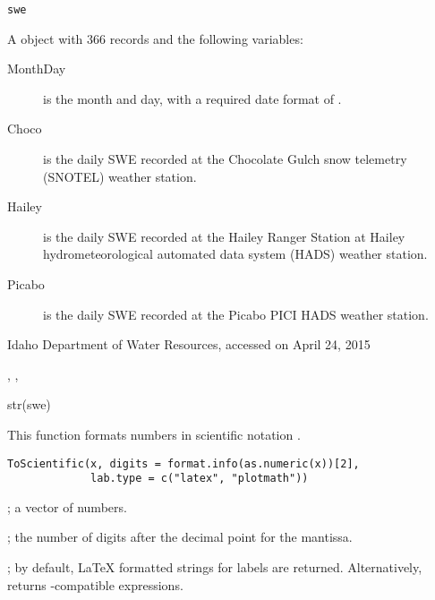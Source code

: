 \documentclass[a4paper]{book}
\begin{document}
%
\begin{Usage}
\begin{verbatim}
swe
\end{verbatim}
\end{Usage}
%
\begin{Format}
A  object with 366 records and the following variables:
\begin{description}

\item[MonthDay] is the month and day, with a required date format of .
\item[Choco] is the daily SWE recorded at the Chocolate Gulch snow telemetry (SNOTEL) weather station.
\item[Hailey] is the daily SWE recorded at the Hailey Ranger Station at Hailey hydrometeorological automated data system (HADS) weather station.
\item[Picabo] is the daily SWE recorded at the Picabo PICI HADS weather station.

\end{description}

\end{Format}
%
\begin{Source}\relax
Idaho Department of Water Resources, accessed on April 24, 2015
\end{Source}
%
\begin{SeeAlso}\relax
{}, , 
\end{SeeAlso}
%
\begin{Examples}
\begin{ExampleCode}
str(swe)
\end{ExampleCode}
\end{Examples}
%
\begin{Description}\relax
This function formats numbers in scientific notation .
\end{Description}
%
\begin{Usage}
\begin{verbatim}
ToScientific(x, digits = format.info(as.numeric(x))[2],
             lab.type = c("latex", "plotmath"))
\end{verbatim}
\end{Usage}
%
\begin{Arguments}
\begin{ldescription}
\item[\code{x}] ; a vector of numbers.
\item[\code{digits}] ; the number of digits after the decimal point for the mantissa.
\item[\code{lab.type}] ; by default, LaTeX formatted strings for labels are returned.
Alternatively,  returns -compatible expressions.
\end{ldescription}
\end{Arguments}
\end{document}
